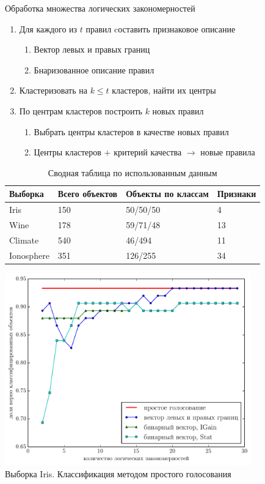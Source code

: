 \documentclass[utf8]{beamer}
\begin{document}
\begin{frame}{Обработка множества логических закономерностей}
  \begin{enumerate}
  \item Для каждого из \(t\) правил cоставить признаковое описание
    \begin{enumerate}
    \item Вектор левых и правых границ
    \item Бнаризованное описание правил
    \end{enumerate}
  \item Кластеризовать на \(k\leq t\) кластеров, найти их центры
  \item По центрам кластеров построить \(k\) новых правил
    \begin{enumerate}
    \item Выбрать центры кластеров в качестве новых правил
    \item Центры кластеров \(+\) критерий качества \(\rightarrow\) новые правила
    \end{enumerate}
  \end{enumerate}
    \begin{table}[!htbp]
      \begin{tabu}{X[1.2] X[2] X[2.8] X}
        Выборка & Всего объектов & Объекты по классам & Признаки\\\hline
        Iris & 150 & 50/50/50 & 4   \\
        Wine & 178 & 59/71/48 & 13  \\
        Climate & 540 & 46/494   & 11  \\
        Ionosphere & 351 & 126/255  & 34  \\
      \end{tabu}
      \caption{Сводная таблица по использованным данным}
    \end{table}
\end{frame}

\begin{frame}
  \centering
  \includegraphics[width=0.8\textwidth,keepaspectratio]{iris}
  \\ Выборка Iris. Классификация методом простого голосования
\end{frame}
\end{document}
